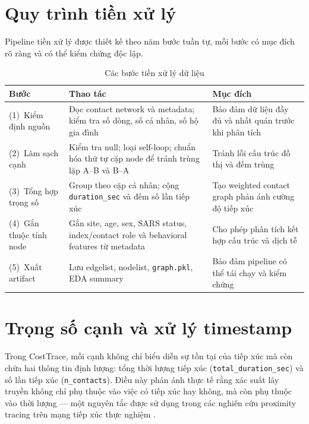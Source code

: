 \documentclass[12pt,a4paper]{report}
\theoremstyle{definition}
\begin{document}
\section{Quy trình tiền xử lý}

Pipeline tiền xử lý được thiết kế theo năm bước tuần tự, mỗi bước có mục đích rõ ràng và có thể kiểm chứng độc lập.

\begin{table}[H]
\centering
\caption{Các bước tiền xử lý dữ liệu}
\label{tab:preprocessing}
\begin{tabularx}{\textwidth}{L{3.2cm} Y Y}
\toprule
\textbf{Bước} & \textbf{Thao tác} & \textbf{Mục đích}\\
\midrule
(1)~Kiểm định nguồn  & Đọc contact network và metadata; kiểm tra số dòng, số cá nhân, số hộ gia đình & Bảo đảm dữ liệu đầy đủ và nhất quán trước khi phân tích\\[4pt]
(2)~Làm sạch cạnh    & Kiểm tra null; loại self-loop; chuẩn hóa thứ tự cặp node để tránh trùng lặp A--B và B--A & Tránh lỗi cấu trúc đồ thị và đếm trùng\\[4pt]
(3)~Tổng hợp trọng số & Group theo cặp cá nhân; cộng \texttt{duration\_sec} và đếm số lần tiếp xúc & Tạo weighted contact graph phản ánh cường độ tiếp xúc\\[4pt]
(4)~Gắn thuộc tính node & Gắn site, age, sex, SARS status, index/contact role và behavioral features từ metadata & Cho phép phân tích kết hợp cấu trúc và dịch tễ\\[4pt]
(5)~Xuất artifact     & Lưu edgelist, nodelist, \texttt{graph.pkl}, EDA summary & Bảo đảm pipeline có thể tái chạy và kiểm chứng\\
\bottomrule
\end{tabularx}
\end{table}

\section{Trọng số cạnh và xử lý timestamp}

Trong CostTrace, mỗi cạnh không chỉ biểu diễn sự tồn tại của tiếp xúc mà còn chứa hai thông tin định lượng: tổng thời lượng tiếp xúc (\texttt{total\_duration\_sec}) và số lần tiếp xúc (\texttt{n\_contacts}). Điều này phản ánh thực tế rằng xác suất lây truyền không chỉ phụ thuộc vào việc có tiếp xúc hay không, mà còn phụ thuộc vào thời lượng --- một nguyên tắc được sử dụng trong các nghiên cứu proximity tracing trên mạng tiếp xúc thực nghiệm \cite{cencetti2021}.
\end{document}
